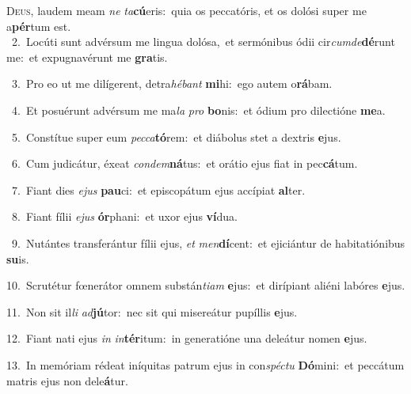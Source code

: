 \lettrine{\initial\textcolor{\initialcolor}{D}}{eus,} laudem meam \textit{ne} \textit{ta}\-\textbf{cú}eris:~\star quia os peccatóris, et os dolósi super me a\-\textbf{pér}\-tum est.\\
{\numbfont\textcolor{\numbcolor}{~2.}}~Locúti sunt advérsum me lingua dolósa,~\dagger et sermónibus ódii cir\-\textit{cum}\-\textit{de}\textbf{dé}runt me:~\star et expugnavérunt me \textbf{gra}\-tis.\par
{\numbfont\textcolor{\numbcolor}{~3.}}~Pro eo ut me dilígerent, detra\-\textit{hé}\-\textit{bant} \textbf{mi}\-hi:~\star ego autem o\-\textbf{rá}\-bam.\par
{\numbfont\textcolor{\numbcolor}{~4.}}~Et posuérunt advérsum me ma\textit{la} \textit{pro} \textbf{bo}\-nis:~\star et ódium pro dilectióne \textbf{me}\-a.\par
{\numbfont\textcolor{\numbcolor}{~5.}}~Constítue super eum \textit{pec}\-\textit{ca}\textbf{tó}rem:~\star et diábolus stet a dextris \textbf{e}\-jus.\par
{\numbfont\textcolor{\numbcolor}{~6.}}~Cum judicátur, éxeat \textit{con}\-\textit{dem}\textbf{ná}tus:~\star et orátio ejus fiat in pec\-\textbf{cá}\-tum.\par
{\numbfont\textcolor{\numbcolor}{~7.}}~Fiant dies \textit{e}\-\textit{jus} \textbf{pau}\-ci:~\star et episcopátum ejus accípiat \textbf{al}\-ter.\par
{\numbfont\textcolor{\numbcolor}{~8.}}~Fiant fílii \textit{e}\-\textit{jus} \textbf{ór}\-phani:~\star et uxor ejus \textbf{ví}\-dua.\par
{\numbfont\textcolor{\numbcolor}{~9.}}~Nutántes transferántur fílii ejus, \textit{et} \textit{men}\-\textbf{dí}cent:~\star et ejiciántur de habitatiónibus \textbf{su}\-is.\par
{\numbfont\textcolor{\numbcolor}{10.}}~Scrutétur fœnerátor omnem substán\-\textit{ti}\-\textit{am} \textbf{e}\-jus:~\star et dirípiant aliéni labóres \textbf{e}\-jus.\par
{\numbfont\textcolor{\numbcolor}{11.}}~Non sit il\textit{li} \textit{ad}\-\textbf{jú}tor:~\star nec sit qui misereátur pupíllis \textbf{e}\-jus.\par
{\numbfont\textcolor{\numbcolor}{12.}}~Fiant nati ejus \textit{in} \textit{in}\-\textbf{tér}itum:~\star in generatióne una deleátur nomen \textbf{e}\-jus.\par
{\numbfont\textcolor{\numbcolor}{13.}}~In memóriam rédeat iníquitas patrum ejus in con\-\textit{spéc}\-\textit{tu} \textbf{Dó}\-mini:~\star et peccátum matris ejus non dele\-\textbf{á}\-tur.\par
